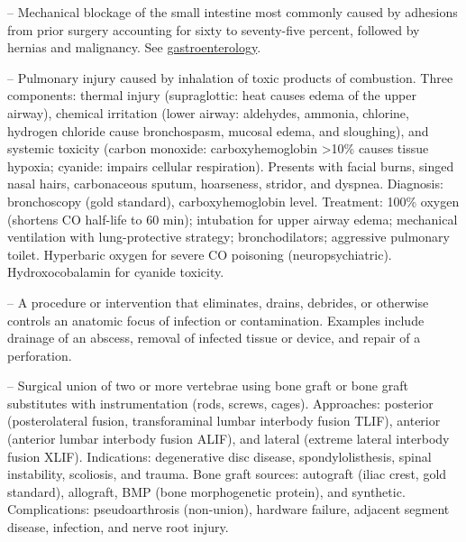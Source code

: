 -- Mechanical blockage of the small intestine most commonly caused by adhesions from prior surgery accounting for sixty to seventy-five percent, followed by hernias and malignancy. See \hyperlink{Gastroenterology}{gastroenterology}.

-- Pulmonary injury caused by inhalation of toxic products of combustion. Three components: thermal injury (supraglottic: heat causes edema of the upper airway), chemical irritation (lower airway: aldehydes, ammonia, chlorine, hydrogen chloride cause bronchospasm, mucosal edema, and sloughing), and systemic toxicity (carbon monoxide: carboxyhemoglobin >10\% causes tissue hypoxia; cyanide: impairs cellular respiration). Presents with facial burns, singed nasal hairs, carbonaceous sputum, hoarseness, stridor, and dyspnea. Diagnosis: bronchoscopy (gold standard), carboxyhemoglobin level. Treatment: 100\% oxygen (shortens CO half-life to 60 min); intubation for upper airway edema; mechanical ventilation with lung-protective strategy; bronchodilators; aggressive pulmonary toilet. Hyperbaric oxygen for severe CO poisoning (neuropsychiatric). Hydroxocobalamin for cyanide toxicity.

-- A procedure or intervention that eliminates, drains, debrides, or otherwise controls an anatomic focus of infection or contamination. Examples include drainage of an abscess, removal of infected tissue or device, and repair of a perforation.

-- Surgical union of two or more vertebrae using bone graft or bone graft substitutes with instrumentation (rods, screws, cages). Approaches: posterior (posterolateral fusion, transforaminal lumbar interbody fusion TLIF), anterior (anterior lumbar interbody fusion ALIF), and lateral (extreme lateral interbody fusion XLIF). Indications: degenerative disc disease, spondylolisthesis, spinal instability, scoliosis, and trauma. Bone graft sources: autograft (iliac crest, gold standard), allograft, BMP (bone morphogenetic protein), and synthetic. Complications: pseudoarthrosis (non-union), hardware failure, adjacent segment disease, infection, and nerve root injury.

